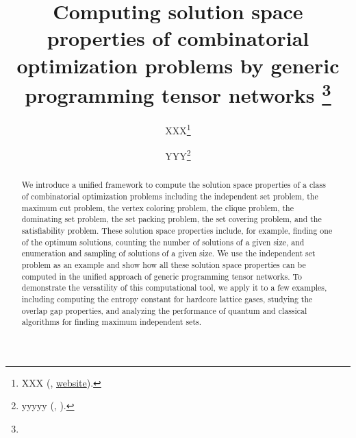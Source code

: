 \documentclass[onefignum, onetabnum]{siamart190516}
\title{Computing solution space properties of combinatorial optimization problems by generic programming tensor networks
\thanks{\funding{...}}
}
\author{XXX\thanks{XXX 
  (\email{email}, \url{website}).}
\and YYY\thanks{yyyyy 
  (\email{yyyy}, \email{email}).}
}
\newcommand{\<}{\langle}
\renewcommand{\>}{\rangle}
\newcounter{example}
\begin{document}
\maketitle

\begin{abstract}
We introduce a unified framework to compute the solution space properties of a class of combinatorial optimization problems including the independent set problem, the maximum cut problem, the vertex coloring problem, the clique problem, the dominating set problem, the set packing problem, the set covering problem, and the satisfiability problem.
These solution space properties include, for example, finding one of the optimum solutions, counting the number of solutions of a given size, and enumeration and sampling of solutions of a given size.
We use the independent set problem as an example and show how all these solution space properties can be computed in the unified approach of generic programming tensor networks.
To demonstrate the versatility of this computational tool, we apply it to a few examples, including computing the entropy constant for hardcore lattice gases, studying the overlap gap properties, and analyzing the performance of quantum and classical algorithms for finding maximum independent sets.
\end{abstract}
\end{document}
